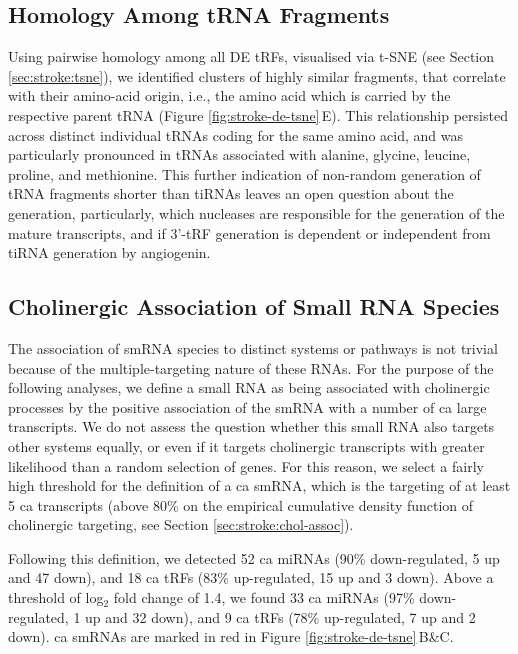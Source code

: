 \subsection{Homology Among tRNA Fragments}
Using pairwise homology among all DE tRFs, visualised via t-SNE (see Section \ref{sec:stroke:tsne}), we identified clusters of highly similar fragments, that correlate with their amino-acid origin, i.e., the amino acid which is carried by the respective parent tRNA (Figure \ref{fig:stroke-de-tsne}\,E). This relationship persisted across distinct individual tRNAs coding for the same amino acid, and was particularly pronounced in tRNAs associated with alanine, glycine, leucine, proline, and methionine. This further indication of non-random generation of tRNA fragments shorter than tiRNAs leaves an open question about the generation, particularly, which nucleases are responsible for the generation of the mature transcripts, and if 3'-tRF generation is dependent or independent from tiRNA generation by angiogenin.

\subsection{Cholinergic Association of Small RNA Species}
The association of smRNA species to distinct systems or pathways is not trivial because of the multiple-targeting nature of these RNAs. For the purpose of the following analyses, we define a small RNA as being associated with cholinergic processes by the positive association of the smRNA with a number of \acf{ca} large transcripts. We do not assess the question whether this small RNA also targets other systems equally, or even if it targets cholinergic transcripts with greater likelihood than a random selection of genes. For this reason, we select a fairly high threshold for the definition of a \ac{ca} smRNA, which is the targeting of at least 5 \ac{ca} transcripts (above 80\% on the empirical cumulative density function of cholinergic targeting, see Section \ref{sec:stroke:chol-assoc}).

Following this definition, we detected 52 \ac{ca} miRNAs (90\% down-regulated, 5 up and 47 down), and 18 \ac{ca} tRFs (83\% up-regulated, 15 up and 3 down). Above a threshold of log$_2$ fold change of 1.4, we found 33 \ac{ca} miRNAs (97\% down-regulated, 1 up and 32 down), and 9 \ac{ca} tRFs (78\% up-regulated, 7 up and 2 down). \ac{ca} smRNAs are marked in red in Figure \ref{fig:stroke-de-tsne}\,B\&C.

\newpage
